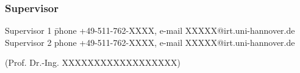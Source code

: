 \documentclass[10pt]{article}
\begin{document}
\subsubsection*{Supervisor}

\begin{tabbing}
Supervisor 1 \hspace{1em}\= phone +49-511-762-XXXX, e-mail XXXXX@irt.uni-hannover.de\\
Supervisor 2             \> phone +49-511-762-XXXX, e-mail XXXXX@irt.uni-hannover.de
\end{tabbing} 




\vfill
\begin{flushright}
(Prof. Dr.-Ing. XXXXXXXXXXXXXXXXXX)
\end{flushright}

\end{document}

